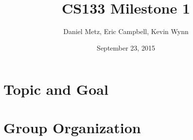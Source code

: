 \documentclass{article}
\title{CS133 Milestone 1}
\author{Daniel Metz, Eric Campbell, Kevin Wynn}
\date{September 23, 2015}
\begin{document}
\maketitle

\section{Topic and Goal}


\section{Group Organization}

\end{document}
